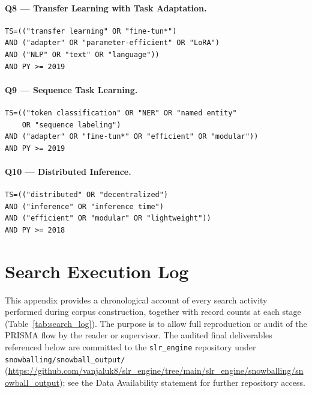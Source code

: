 \paragraph{Q8 — Transfer Learning with Task Adaptation.}
\begin{verbatim}
TS=(("transfer learning" OR "fine-tun*")
AND ("adapter" OR "parameter-efficient" OR "LoRA")
AND ("NLP" OR "text" OR "language"))
AND PY >= 2019
\end{verbatim}

\paragraph{Q9 — Sequence Task Learning.}
\begin{verbatim}
TS=(("token classification" OR "NER" OR "named entity"
    OR "sequence labeling")
AND ("adapter" OR "fine-tun*" OR "efficient" OR "modular"))
AND PY >= 2019
\end{verbatim}

\paragraph{Q10 — Distributed Inference.}
\begin{verbatim}
TS=(("distributed" OR "decentralized")
AND ("inference" OR "inference time")
AND ("efficient" OR "modular" OR "lightweight"))
AND PY >= 2018
\end{verbatim}


\section[\appendixname~\thesection]{Search Execution Log}
\label{app:search_log}

This appendix provides a chronological account of every search activity performed
during corpus construction, together with record counts at each stage
(Table~\ref{tab:search_log}). The purpose
is to allow full reproduction or audit of the PRISMA flow by the reader or supervisor.
The audited final deliverables referenced below are committed to the
\texttt{slr\_engine} repository under
\texttt{snowballing/snowball\_output/}
(\url{https://github.com/vanjaluk8/slr_engine/tree/main/slr_engine/snowballing/snowball_output});
see the Data Availability statement for further repository access.

